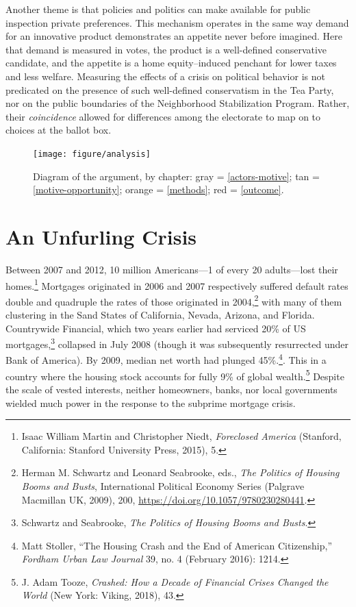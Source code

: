 \documentclass[12pt,oneside]{psthesis}
\begin{document}
Another theme is that policies and politics can make available for public inspection private preferences.
This mechanism operates in the same way demand for an innovative product demonstrates an appetite never before imagined.
Here that demand is measured in votes, the product is a well-defined conservative candidate, and the appetite is a home equity--induced penchant for lower taxes and less welfare.
Measuring the effects of a crisis on political behavior is not predicated on the presence of such well-defined conservatism in the Tea Party, nor on the public boundaries of the Neighborhood Stabilization Program.
Rather, their \emph{coincidence} allowed for differences among the electorate to map on to choices at the ballot box.
\begin{figure}

{\centering \texttt{[image: figure/analysis]} 

}

\caption{Diagram of the argument, by chapter: gray = \ref{actors-motive}; tan = \ref{motive-opportunity}; orange = \ref{methods}; red = \ref{outcome}.}\label{fig:analysis}
\end{figure}
\hypertarget{crisis}{%
\section{An Unfurling Crisis}\label{crisis}}

Between 2007 and 2012, 10 million Americans---1 of every 20 adults---lost their homes.\footnote{Isaac William Martin and Christopher Niedt, \emph{Foreclosed America} (Stanford, California: Stanford University Press, 2015), 5.}
Mortgages originated in 2006 and 2007 respectively suffered default rates double and quadruple the rates of those originated in 2004,\footnote{Herman M. Schwartz and Leonard Seabrooke, eds., \emph{The Politics of Housing Booms and Busts}, International Political Economy Series (Palgrave Macmillan UK, 2009), 200, \url{https://doi.org/10.1057/9780230280441}.} with many of them clustering in the Sand States of California, Nevada, Arizona, and Florida.
Countrywide Financial, which two years earlier had serviced 20\% of US mortgages,\footnote{Schwartz and Seabrooke, \emph{The Politics of Housing Booms and Busts}.} collapsed in July 2008 (though it was subsequently resurrected under Bank of America).
By 2009, median net worth had plunged 45\%.\footnote{Matt Stoller, ``The Housing Crash and the End of American Citizenship,'' \emph{Fordham Urban Law Journal} 39, no. 4 (February 2016): 1214.}.
This in a country where the housing stock accounts for fully 9\% of global wealth.\footnote{J. Adam Tooze, \emph{Crashed: How a Decade of Financial Crises Changed the World} (New York: Viking, 2018), 43.}
Despite the scale of vested interests, neither homeowners, banks, nor local governments wielded much power in the response to the subprime mortgage crisis.
\end{document}
